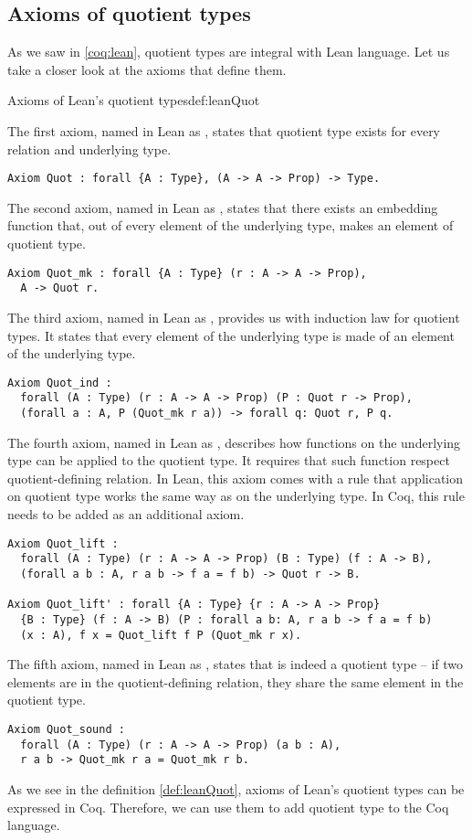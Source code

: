 \subsection{Axioms of quotient types}
As we saw in \ref{coq:lean}, quotient types are integral with Lean language. Let us take a closer look at the axioms that define them.
\begin{defi}{Axioms of Lean's quotient types}{def:leanQuot}

The first axiom, named in Lean as , states that quotient type exists for every relation and underlying type.
\begin{verbatim}
Axiom Quot : forall {A : Type}, (A -> A -> Prop) -> Type.
\end{verbatim}
The second axiom, named in Lean as , states that there exists an embedding function that, out of every element of the underlying type, makes an element of quotient type.
\begin{verbatim}
Axiom Quot_mk : forall {A : Type} (r : A -> A -> Prop),
  A -> Quot r.
\end{verbatim}
The third axiom, named in Lean as , provides us with induction law for quotient types. It states that every element of the underlying type is made of an element of the underlying type.
\begin{verbatim}
Axiom Quot_ind : 
  forall (A : Type) (r : A -> A -> Prop) (P : Quot r -> Prop),
  (forall a : A, P (Quot_mk r a)) -> forall q: Quot r, P q.
\end{verbatim}
The fourth axiom, named in Lean as , describes how functions on the underlying type can be applied to the quotient type. It requires that such function respect quotient-defining relation. In Lean, this axiom comes with a rule that application on quotient type works the same way as on the underlying type. In Coq, this rule needs to be added as an additional axiom.
\begin{verbatim}
Axiom Quot_lift :
  forall (A : Type) (r : A -> A -> Prop) (B : Type) (f : A -> B),
  (forall a b : A, r a b -> f a = f b) -> Quot r -> B.

Axiom Quot_lift' : forall {A : Type} {r : A -> A -> Prop} 
  {B : Type} (f : A -> B) (P : forall a b: A, r a b -> f a = f b) 
  (x : A), f x = Quot_lift f P (Quot_mk r x).
\end{verbatim}
The fifth axiom, named in Lean as , states that  is indeed a quotient type -- if two elements are in the quotient-defining relation, they share the same element in the quotient type.
\begin{verbatim}
Axiom Quot_sound :
  forall (A : Type) (r : A -> A -> Prop) (a b : A),
  r a b -> Quot_mk r a = Quot_mk r b.
\end{verbatim}
\end{defi}
As we see in the definition \ref{def:leanQuot}, axioms of Lean's quotient types can be expressed in Coq. Therefore, we can use them to add quotient type to the Coq language.

